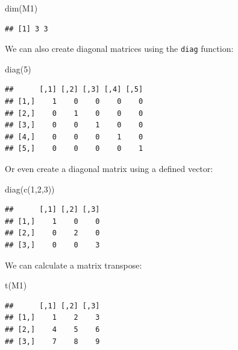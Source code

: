 \documentclass[
]{book}
\newenvironment{Shaded}{\begin{snugshade}}{\end{snugshade}}
\newcommand{\DecValTok}[1]{\textcolor[rgb]{0.00,0.00,0.81}{#1}}
\newcommand{\FunctionTok}[1]{\textcolor[rgb]{0.00,0.00,0.00}{#1}}
\newcommand{\NormalTok}[1]{#1}
\theoremstyle{definition}
\theoremstyle{definition}
\theoremstyle{definition}
\theoremstyle{definition}
\theoremstyle{remark}
\begin{document}
\begin{Shaded}
\begin{Highlighting}[]
\FunctionTok{dim}\NormalTok{(M1)}
\end{Highlighting}
\end{Shaded}

\begin{verbatim}
## [1] 3 3
\end{verbatim}

We can also create diagonal matrices using the \texttt{diag} function:

\begin{Shaded}
\begin{Highlighting}[]
\FunctionTok{diag}\NormalTok{(}\DecValTok{5}\NormalTok{)}
\end{Highlighting}
\end{Shaded}

\begin{verbatim}
##      [,1] [,2] [,3] [,4] [,5]
## [1,]    1    0    0    0    0
## [2,]    0    1    0    0    0
## [3,]    0    0    1    0    0
## [4,]    0    0    0    1    0
## [5,]    0    0    0    0    1
\end{verbatim}

Or even create a diagonal matrix using a defined vector:

\begin{Shaded}
\begin{Highlighting}[]
\FunctionTok{diag}\NormalTok{(}\FunctionTok{c}\NormalTok{(}\DecValTok{1}\NormalTok{,}\DecValTok{2}\NormalTok{,}\DecValTok{3}\NormalTok{))}
\end{Highlighting}
\end{Shaded}

\begin{verbatim}
##      [,1] [,2] [,3]
## [1,]    1    0    0
## [2,]    0    2    0
## [3,]    0    0    3
\end{verbatim}

We can calculate a matrix transpose:

\begin{Shaded}
\begin{Highlighting}[]
\FunctionTok{t}\NormalTok{(M1)}
\end{Highlighting}
\end{Shaded}

\begin{verbatim}
##      [,1] [,2] [,3]
## [1,]    1    2    3
## [2,]    4    5    6
## [3,]    7    8    9
\end{verbatim}
\end{document}
